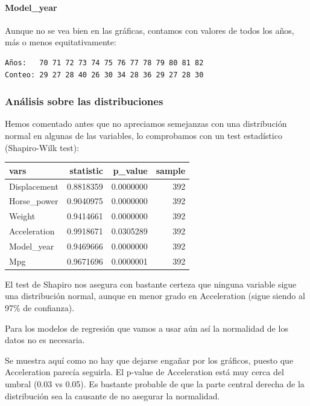 \paragraph{Model\_year}
Aunque no se vea bien en las gráficas, contamos con valores de todos los años, más o menos equitativamente:

\begin{verbatim}
Años:   70 71 72 73 74 75 76 77 78 79 80 81 82 
Conteo: 29 27 28 40 26 30 34 28 36 29 27 28 30 
\end{verbatim}


\subsubsection{Análisis sobre las distribuciones}

Hemos comentado antes que no apreciamos semejanzas con una distribución normal en algunas de las variables, lo comprobamos con un test estadístico (Shapiro-Wilk test):
\vspace{\baselineskip}

\begin{tabular}{l|r|r|r}
\hline
vars & statistic & p\_value & sample\\
\hline
Displacement & 0.8818359 & 0.0000000 & 392\\
\hline
Horse\_power & 0.9040975 & 0.0000000 & 392\\
\hline
Weight & 0.9414661 & 0.0000000 & 392\\
\hline
Acceleration & 0.9918671 & 0.0305289 & 392\\
\hline
Model\_year & 0.9469666 & 0.0000000 & 392\\
\hline
Mpg & 0.9671696 & 0.0000001 & 392\\
\hline
\end{tabular}

\vspace{\baselineskip}

El test de Shapiro nos asegura con bastante certeza que ninguna variable sigue una distribución normal, aunque en menor grado en Acceleration (sigue siendo al 97\% de confianza).

Para los modelos de regresión que vamos a usar aún así la normalidad de los datos no es necesaria.
\vspace{\baselineskip}

Se muestra aquí como no hay que dejarse engañar por los gráficos, puesto que Acceleration parecía seguirla. El p-value de Acceleration está muy cerca del umbral (0.03 vs 0.05). Es bastante probable de que la parte central derecha de la distribución sea la causante de no asegurar la normalidad.

